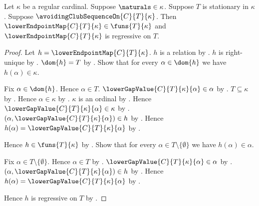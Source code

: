 \begin{theorem}\label{lower_endpoint_map_type_and_regressive}
    Let $\kappa$ be a regular cardinal.
    Suppose $\naturals\in\kappa$.
    Suppose $T$ is stationary in $\kappa$.
    Suppose $\avoidingClubSequenceOn{C}{T}{\kappa}$.
    Then $\lowerEndpointMap{C}{T}{\kappa}\in\funs{T}{\kappa}$ and
        $\lowerEndpointMap{C}{T}{\kappa}$ is regressive on $T$.
\end{theorem}
\begin{proof}
    Let $h=\lowerEndpointMap{C}{T}{\kappa}$.
    $h$ is a relation by .
    $h$ is right-unique
        by .
    $\dom{h}=T$
        by .
    Show that for every $\alpha\in\dom{h}$ we have $h(\alpha)\in\kappa$.
    \begin{subproof}
        Fix $\alpha\in\dom{h}$.
        Hence $\alpha\in T$.
        $\lowerGapValue{C}{T}{\kappa}{\alpha}\in\alpha$
            by .
        $T\subseteq\kappa$ by .
        Hence $\alpha\in\kappa$ by .
        $\kappa$ is an ordinal by .
        Hence $\lowerGapValue{C}{T}{\kappa}{\alpha}\in\kappa$
            by .
        $(\alpha,\lowerGapValue{C}{T}{\kappa}{\alpha})\in h$
            by .
        Hence $h(\alpha)=\lowerGapValue{C}{T}{\kappa}{\alpha}$
            by .
    \end{subproof}
    Hence $h\in\funs{T}{\kappa}$ by .
    Show that for every $\alpha\in T\setminus\{\emptyset\}$ we have
        $h(\alpha)\in\alpha$.
    \begin{subproof}
        Fix $\alpha\in T\setminus\{\emptyset\}$.
        Hence $\alpha\in T$ by .
        $\lowerGapValue{C}{T}{\kappa}{\alpha}\in\alpha$
            by .
        $(\alpha,\lowerGapValue{C}{T}{\kappa}{\alpha})\in h$
            by .
        Hence $h(\alpha)=\lowerGapValue{C}{T}{\kappa}{\alpha}$
            by .
    \end{subproof}
    Hence $h$ is regressive on $T$ by .
\end{proof}

